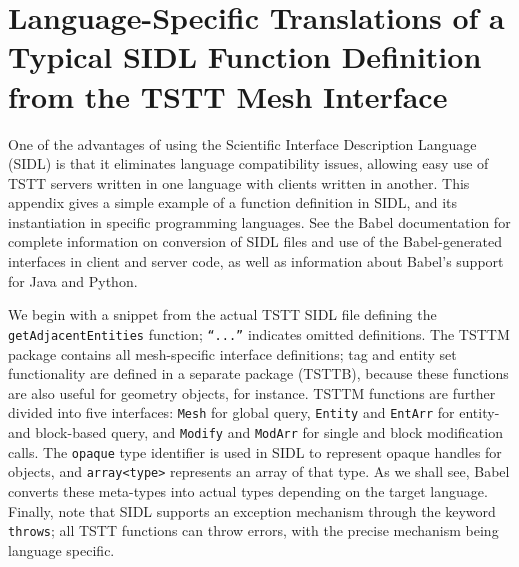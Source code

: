 \section{Language-Specific Translations of a Typical SIDL Function
Definition from the TSTT Mesh Interface}

One of the advantages of using the Scientific Interface Description
Language (SIDL) is that it eliminates language compatibility issues,
allowing easy use of TSTT servers written in one language with clients
written in another. This appendix gives a simple example of a function
definition in SIDL, and its instantiation in specific programming
languages. See the Babel documentation for complete information on
conversion of SIDL files and use of the Babel-generated interfaces
in client and server code, as well as information about Babel's support
for Java and Python.

We begin with a snippet from the actual TSTT SIDL file defining the
\texttt{getAdjacentEntities} function; \texttt{{}``...''} indicates
omitted definitions. The TSTTM package contains all mesh-specific
interface definitions; tag and entity set functionality are defined
in a separate package (TSTTB), because these functions are also useful
for geometry objects, for instance. TSTTM functions are further divided
into five interfaces: \texttt{Mesh} for global query, \texttt{Entity}
and \texttt{EntArr} for entity- and block-based query, and \texttt{Modify}
and \texttt{ModArr} for single and block modification calls. The \texttt{opaque}
type identifier is used in SIDL to represent opaque handles for objects,
and \texttt{array<type>} represents an array of that type. As we shall
see, Babel converts these meta-types into actual types depending on
the target language. Finally, note that SIDL supports an exception
mechanism through the keyword \texttt{throws}; all TSTT functions
can throw errors, with the precise mechanism being language specific. 

